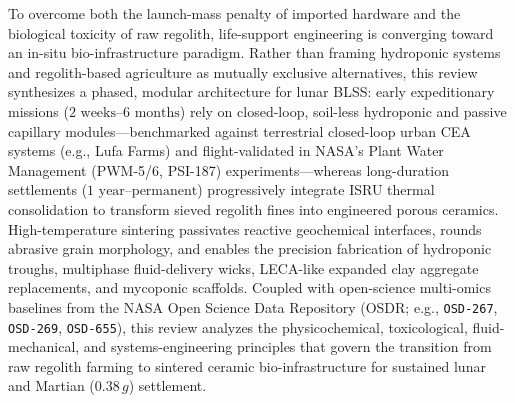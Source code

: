 To overcome both the launch-mass penalty of imported hardware and the biological toxicity of raw regolith, life-support engineering is converging toward an in-situ bio-infrastructure paradigm\cite{ming1989lunar,taylor2005microwave,fateri2019solar}. Rather than framing hydroponic systems and regolith-based agriculture as mutually exclusive alternatives, this review synthesizes a phased, modular architecture for lunar BLSS: early expeditionary missions ($2\text{ weeks}\text{--}6\text{ months}$) rely on closed-loop, soil-less hydroponic and passive capillary modules—benchmarked against terrestrial closed-loop urban CEA systems (e.g., Lufa Farms) and flight-validated in NASA's Plant Water Management (PWM-5/6, PSI-187) experiments\cite{weislogel2026pwm,hatch2022pwm,pwm2020ntrs}—whereas long-duration settlements ($1\text{ year}\text{--}\text{permanent}$) progressively integrate ISRU thermal consolidation to transform sieved regolith fines into engineered porous ceramics\cite{ming1989lunar,taylor2005microwave,xi2026multiphysics}. High-temperature sintering passivates reactive geochemical interfaces, rounds abrasive grain morphology, and enables the precision fabrication of hydroponic troughs, multiphase fluid-delivery wicks, LECA-like expanded clay aggregate replacements, and mycoponic scaffolds\cite{ming1989lunar,xi2026multiphysics,goulas2017process}. Coupled with open-science multi-omics baselines from the NASA Open Science Data Repository (OSDR; e.g., \texttt{OSD-267}, \texttt{OSD-269}, \texttt{OSD-655})\cite{gebre2025nasa}, this review analyzes the physicochemical, toxicological, fluid-mechanical, and systems-engineering principles that govern the transition from raw regolith farming to sintered ceramic bio-infrastructure for sustained lunar and Martian ($0.38\,g$) settlement.
